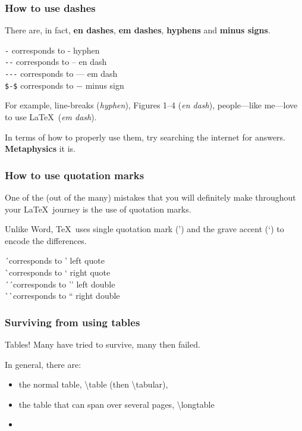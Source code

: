 \documentclass[11pt]{beamer}
\begin{document}
\begin{frame}[containsverbatim]
\frametitle{How to use dashes}

There are, in fact, \textbf{en dashes}, \textbf{em dashes}, \textbf{hyphens} and \textbf{minus signs}.

\bigskip

\centering
\verb|-| corresponds to - hyphen\\
\verb|--| corresponds to -- en dash\\
\verb|---| corresponds to --- em dash\\
\verb|$-$| corresponds to $-$ minus sign

\bigskip

\raggedright
For example, line-breaks (\textit{hyphen}), Figures 1--4 (\textit{en dash}), people---like me---love to use \LaTeX \ (\textit{em dash}). 

In terms of how to properly use them, try searching the internet for answers. \textbf{Metaphysics} it is.

\end{frame}

\begin{frame}
\frametitle{How to use quotation marks}

One of the (out of the many) mistakes that you will definitely make throughout your \LaTeX \ journey is the use of quotation marks.

Unlike Word, \TeX \ uses single quotation mark (') and the grave accent (`) to encode the differences.

\bigskip

\centering
\' \ corresponds to ' left quote\\
\` \ corresponds to ` right quote\\
\' \ \' \ corresponds to '' left double\\
\` \ \` \ corresponds to `` right double

\bigskip

\raggedright

\end{frame}

\begin{frame}
	\frametitle{Surviving from using tables}
	
	Tables! Many have tried to survive, many then failed.
	
	\bigskip
	
	In general, there are: 
	
	\begin{itemize}
	\item the normal table, \textbackslash table (then \textbackslash tabular), 
	\item the table that can span over several pages, \textbackslash longtable
	\item 
	\end{itemize}
\end{frame}
\end{document}
